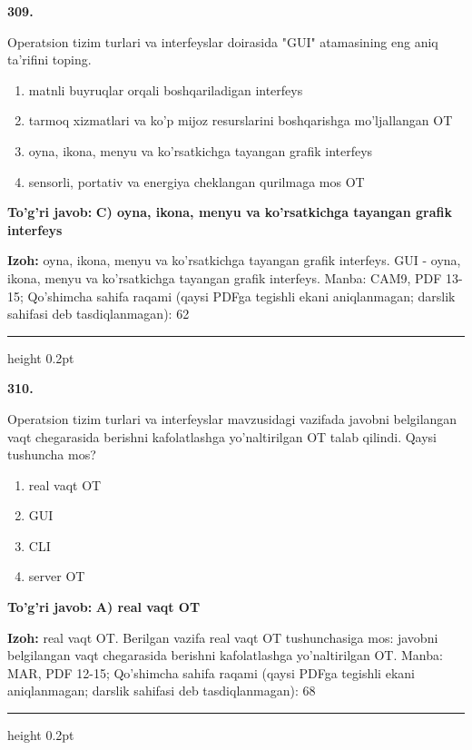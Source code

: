 \documentclass[10pt,a4paper]{article}
\begin{document}
{\bfseries\sffamily\color{ink} 309.}
\par
Operatsion tizim turlari va interfeyslar doirasida "GUI" atamasining eng aniq ta'rifini toping.
\begin{enumerate}[label=\Alph*),leftmargin=9mm]
\item matnli buyruqlar orqali boshqariladigan interfeys
\item tarmoq xizmatlari va ko'p mijoz resurslarini boshqarishga mo'ljallangan OT
\item oyna, ikona, menyu va ko'rsatkichga tayangan grafik interfeys
\item sensorli, portativ va energiya cheklangan qurilmaga mos OT
\end{enumerate}
\begin{tcolorbox}[enhanced,breakable,colback=teal!4,colframe=teal!60!black,boxrule=0.45pt,arc=1.2mm,left=2.7mm,right=2.7mm,top=1.8mm,bottom=1.8mm,before skip=2mm,after skip=2mm]
{\bfseries\sffamily\color{teal}To'g'ri javob:} \textbf{C) oyna, ikona, menyu va ko'rsatkichga tayangan grafik interfeys}
\par\smallskip
{\bfseries Izoh:} oyna, ikona, menyu va ko'rsatkichga tayangan grafik interfeys. GUI - oyna, ikona, menyu va ko'rsatkichga tayangan grafik interfeys. Manba: CAM9, PDF 13-15; Qo'shimcha sahifa raqami (qaysi PDFga tegishli ekani aniqlanmagan; darslik sahifasi deb tasdiqlanmagan): 62
\end{tcolorbox}
\vspace{2mm}\hrule height 0.2pt\vspace{3mm}

{\bfseries\sffamily\color{ink} 310.}
\par
Operatsion tizim turlari va interfeyslar mavzusidagi vazifada javobni belgilangan vaqt chegarasida berishni kafolatlashga yo'naltirilgan OT talab qilindi. Qaysi tushuncha mos?
\begin{enumerate}[label=\Alph*),leftmargin=9mm]
\item real vaqt OT
\item GUI
\item CLI
\item server OT
\end{enumerate}
\begin{tcolorbox}[enhanced,breakable,colback=teal!4,colframe=teal!60!black,boxrule=0.45pt,arc=1.2mm,left=2.7mm,right=2.7mm,top=1.8mm,bottom=1.8mm,before skip=2mm,after skip=2mm]
{\bfseries\sffamily\color{teal}To'g'ri javob:} \textbf{A) real vaqt OT}
\par\smallskip
{\bfseries Izoh:} real vaqt OT. Berilgan vazifa real vaqt OT tushunchasiga mos: javobni belgilangan vaqt chegarasida berishni kafolatlashga yo'naltirilgan OT. Manba: MAR, PDF 12-15; Qo'shimcha sahifa raqami (qaysi PDFga tegishli ekani aniqlanmagan; darslik sahifasi deb tasdiqlanmagan): 68
\end{tcolorbox}
\vspace{2mm}\hrule height 0.2pt\vspace{3mm}
\end{document}
